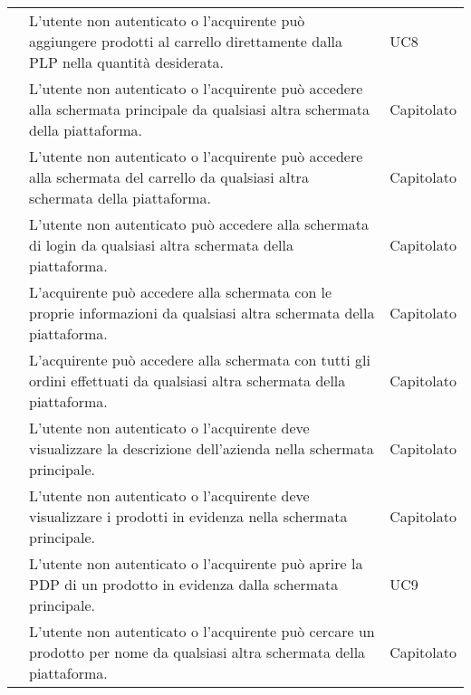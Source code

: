 \begin{longtable}{|c C{9.5cm} C{2.5cm}|}
     & L'utente non autenticato o l'acquirente può aggiungere prodotti al carrello direttamente dalla PLP nella quantità desiderata. & UC8 \\


     & L'utente non autenticato o l'acquirente può accedere alla schermata principale da qualsiasi altra schermata della piattaforma. & Capitolato \\

     & L'utente non autenticato o l'acquirente può accedere alla schermata del carrello da qualsiasi altra schermata della piattaforma. & Capitolato \\

     & L'utente non autenticato può accedere alla schermata di login da qualsiasi altra schermata della piattaforma. & Capitolato \\

     & L'acquirente può accedere alla schermata con le proprie informazioni da qualsiasi altra schermata della piattaforma. & Capitolato \\

     & L'acquirente può accedere alla schermata con tutti gli ordini effettuati da qualsiasi altra schermata della piattaforma. & Capitolato \\


     & L'utente non autenticato o l'acquirente deve visualizzare la descrizione dell'azienda nella schermata principale. & Capitolato \\
    
     & L'utente non autenticato o l'acquirente deve visualizzare i prodotti in evidenza nella schermata principale. & Capitolato \\

     & L'utente non autenticato o l'acquirente può aprire la PDP di un prodotto in evidenza dalla schermata principale. & UC9 \\
    
     & L'utente non autenticato o l'acquirente può cercare un prodotto per nome da qualsiasi altra schermata della piattaforma. & Capitolato \\
    

\end{longtable}
